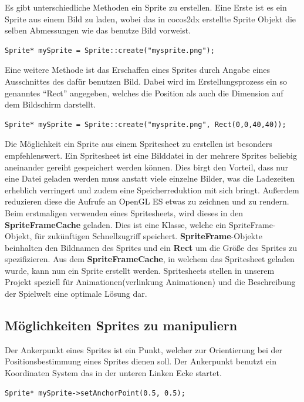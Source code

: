 Es gibt unterschiedliche Methoden ein Sprite zu erstellen. Eine Erste ist es ein Sprite aus einem Bild zu laden, wobei das in cocos2dx erstellte Sprite Objekt die selben Abmessungen wie das benutze Bild vorweist. 

\begin{lstlisting}[style=singleline]
Sprite* mySprite = Sprite::create("mysprite.png");
\end{lstlisting}

Eine weitere Methode ist das Erschaffen eines Sprites durch Angabe eines Ausschnittes des dafür benutzen Bild. Dabei wird im Erstellungsprozess ein so genanntes “Rect” angegeben, welches die Position als auch die Dimension auf dem Bildschirm darstellt. 

\begin{lstlisting}[style=singleline]
Sprite* mySprite = Sprite::create("mysprite.png", Rect(0,0,40,40));
\end{lstlisting}

Die Möglichkeit ein Sprite aus einem Spritesheet zu erstellen ist besonders empfehlenswert. Ein Spritesheet ist eine Bilddatei in der mehrere Sprites beliebig aneinander gereiht gespeichert werden können. Dies birgt den Vorteil, dass nur eine Datei geladen werden muss anstatt viele einzelne Bilder, was die Ladezeiten erheblich verringert und zudem eine Speicherreduktion mit sich bringt. Außerdem reduzieren diese die Aufrufe an OpenGL ES etwas zu zeichnen und zu rendern. Beim erstmaligen verwenden eines Spritesheets, wird dieses in den \textbf{SpriteFrameCache} geladen.  Dies ist eine Klasse, welche ein SpriteFrame-Objekt, für zukünftigen Schnellzugriff speichert. \textbf{SpriteFrame}-Objekte beinhalten den Bildnamen des Sprites und ein \textbf{Rect} um die Größe des Sprites zu spezifizieren. Aus dem \textbf{SpriteFrameCache}, in welchem das Spritesheet geladen wurde, kann nun ein Sprite erstellt werden.
Spritesheets stellen in unserem Projekt speziell für Animationen(verlinkung Animationen) und die Beschreibung der Spielwelt eine optimale Lösung dar. 


\subsection{Möglichkeiten Sprites zu manipuliern}
Der Ankerpunkt eines Sprites ist ein Punkt, welcher zur Orientierung bei der Positionsbestimmung eines Sprites dienen soll. Der Ankerpunkt benutzt ein Koordinaten System das in der unteren Linken Ecke startet. 

\begin{lstlisting}[style=singleline]
Sprite* mySprite->setAnchorPoint(0.5, 0.5);
\end{lstlisting}


